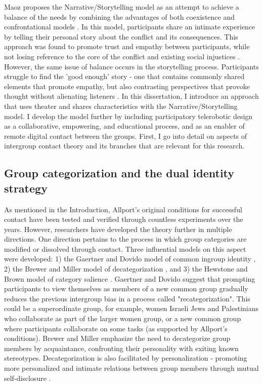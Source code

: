 \documentclass[dissertation,math,vertlayout,pdfa,colorlinks,nologo]{aaltoseries}
\begin{document}
Maoz proposes the Narrative/Storytelling model as an attempt to achieve a balance of the needs by combining the advantages of both coexistence and confrontational models \cite{maozDoesContactWork2011}. In this model, participants share an intimate experience by telling their personal story about the conflict and its consequences. This approach was found to promote trust and empathy between participants, while not losing reference to the core of the conflict and existing social injustices \cite{bar-onConciliationStorytellingVictimhood2002,bar-onTellYourLife2006,bar-onStorytellingWayWork2004}. However, the same issue of balance occurs in the storytelling process. Participants struggle to find the 'good enough' story - one that contains commonly shared elements that promote empathy, but also contrasting perspectives that provoke thought without alienating listeners \cite{bar-onTellYourLife2006}. In this dissertation, I introduce an approach that uses theater and shares characteristics with the Narrative/Storytelling model. I develop the model further by including participatory telerobotic design as a collaborative, empowering, and educational process, and as an enabler of remote digital contact between the groups. First, I go into detail on aspects of intergroup contact theory and its branches that are relevant for this research.

\subsection{Group categorization and the dual identity strategy}
\label{sec:dual_identity}
As mentioned in the Introduction, Allport's original conditions for successful contact have been tested and verified through countless experiments over the years. However, researchers have developed the theory further in multiple directions. One direction pertains to the process in which group categories are modified or dissolved through contact. Three influential models on this aspect were developed: 1) the Gaertner and Dovido model of common ingroup identity \cite{gaertnerReducingIntergroupBias2000}, 2) the Brewer and Miller model of decategorization \cite{brewerContactHypothesisTheoretical1984}, and 3) the Hewstone and Brown model of category salience \cite{hewstoneContactNotEnough1986}. Gaertner and Dovido suggest that prompting participants to view themselves as members of a new common group gradually reduces the previous intergroup bias in a process called "recategorization". This could be a superordinate group, for example, women Israeli Jews and Palestinians who collaborate as part of the larger women group, or a new common group where participants collaborate on some tasks \cite{gaertnerCategorizationRecategorizationIntergroup2005} (as supported by Allport's conditions). Brewer and Miller emphasize the need to decategorize group members by acquaintance, confronting their personality with exiting known stereotypes. Decategorization is also facilitated by personalization - promoting more personalized and intimate relations between group members through mutual self-disclosure \cite{millerPersonalizationPromiseContact2002}.
\end{document}
